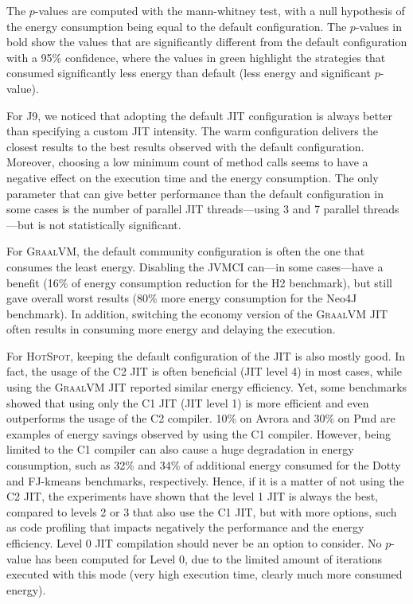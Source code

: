 The $p$-values are computed with the mann-whitney test, with a null hypothesis of the energy consumption being equal to the default configuration.
The $p$-values in bold show the values that are significantly different from the default configuration with a 95\% confidence, where the values in green highlight the strategies that consumed significantly less energy than default (less energy and significant $p$-value).



For \textsc{J9}, we noticed that adopting the default JIT configuration is always better than specifying a custom JIT intensity.
The \textsf{warm} configuration delivers the closest results to the best results observed with the default configuration.
Moreover, choosing a low minimum count of method calls seems to have a negative effect on the execution time and the energy consumption.
The only parameter that can give better performance than the default configuration in some cases is the number of parallel JIT threads---using 3 and 7 parallel threads---but is not statistically significant.

For \textsc{GraalVM}, the default community configuration is often the one that consumes the least energy.
Disabling the JVMCI can---in some cases---have a benefit (16\% of energy consumption reduction for the \textsf{H2} benchmark), but still gave overall worst results (80\% more energy consumption for the \textsf{Neo4J} benchmark).
In addition, switching the economy version of the \textsc{GraalVM} JIT often results in consuming more energy and delaying the execution.

For \textsc{HotSpot}, keeping the default configuration of the JIT is also mostly good.
In fact, the usage of the C2 JIT is often beneficial (JIT level 4) in most cases, while using the \textsc{GraalVM} JIT reported similar energy efficiency.
Yet, some benchmarks showed that using only the C1 JIT (JIT level 1) is more efficient and even outperforms the usage of the C2 compiler.
10\% on \textsf{Avrora} and 30\% on \textsf{Pmd} are examples of energy savings observed by using the C1 compiler.
However, being limited to the C1 compiler can also cause a huge degradation in energy consumption, such as 32\% and 34\% of additional energy consumed for the \textsf{Dotty} and \textsf{FJ-kmeans} benchmarks, respectively.
Hence, if it is a matter of not using the C2 JIT, the experiments have shown that the level 1 JIT is always the best, compared to levels 2 or 3 that also use the C1 JIT, but with more options, such as code profiling that impacts negatively the performance and the energy efficiency.
Level 0 JIT compilation should never be an option to consider.
No $p$-value has been computed for Level 0, due to the limited amount of iterations executed with this mode (very high execution time, clearly much more consumed energy).

